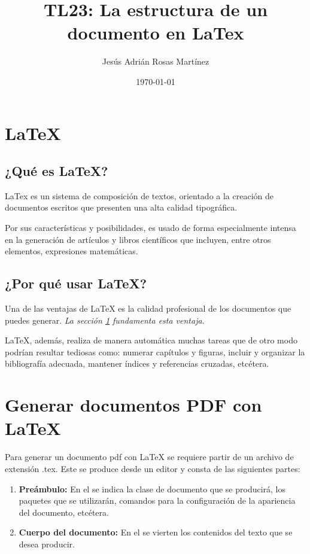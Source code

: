 \documentclass[12pt]{article}
\title{TL23: La estructura de un documento en LaTex}
\author{Jes\'us Adri\'an Rosas Mart\'inez}
\date{\small{\today}}
\begin{document}
\maketitle %


\tableofcontents %

\section{LaTeX} %
\label{sec:latex} %
\subsection{¿Qué es LaTeX?} %
LaTex es un sistema de composición de textos, orientado a la creación de documentos escritos que presenten una alta calidad tipográfica.

Por sus características y posibilidades, es usado de forma especialmente intensa en la generación de artículos y libros científicos que incluyen, entre otros elementos, expresiones matemáticas.

\subsection{¿Por qué usar LaTeX?} %
Una de las ventajas de LaTeX es la calidad profesional de los documentos que puedes generar. \textsl{\footnotesize{La sección \ref{sec:latex} fundamenta esta ventaja}}.

LaTeX, además, realiza de manera automática muchas tareas que de otro modo podrían resultar tediosas como: numerar capítulos y figuras, incluir y organizar la bibliografía adecuada, mantener índices y referencias cruzadas, etcétera.

\section{Generar documentos PDF con LaTeX} %
Para generar un documento pdf con LaTeX se requiere partir de un archivo de extensión .tex. Este se produce desde un editor y consta de las siguientes partes:

\begin{enumerate} %
\item \textbf{\Large{Preámbulo:}} En el se indica la clase de documento que se producirá, los paquetes que se utilizarán, comandos para la configuración de la apariencia del documento, etcétera.
\item \textbf{\Large{Cuerpo del documento:}} En el se vierten los contenidos del texto que se desea producir.
\end{enumerate}
\end{document}
